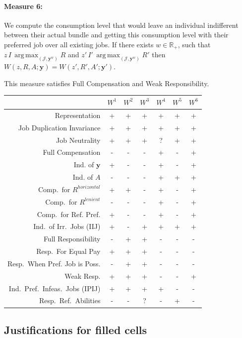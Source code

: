\documentclass[12pt,thmsb]{article}
\DeclareMathOperator*{\argmax}{arg\,max}
\begin{document}
\paragraph{Measure 6:} We compute the consumption level that would leave an individual indifferent between their actual bundle and getting this consumption level with their preferred job over all existing jobs. If there exists $w\in\mathbb{R}_{+}$, such that $z\,I\,\argmax_{(\mathcal{J},\mathbf{y}^w)}R$ and $z'\,I'\,\argmax_{(\mathcal{J},\mathbf{y}^w)}R'$ then $W(z,R,A;\mathbf{y})=W(z',R',A';\mathbf{y}')$.

This measure satisfies Full Compensation and Weak Responsibility.

\begin{center}
\begin{tabular}{r|c|c|c|c|c|c|}
 & $W^1$ & $W^2$ & $W^3$ & $W^4$ & $W^5$ & $W^6$ \\
\hline
Representation & + & + & + & + & + & + \\
Job Duplication Invariance & + & + & + & + & + & + \\
Job Neutrality & + & + & + & ? & + & + \\
Full Compensation & - & - & - & + & - & + \\
Ind. of $\mathbf{y}$ & + & - & - & + & - & + \\
Ind. of $A$ & - & - & - & + & + & + \\
Comp.\ for $R^{horizontal}$ & + & + & - & + & - & + \\
Comp.\ for $R^{lenient}$ & - & - & - & + & - & + \\
Comp.\ for Ref. Pref. & + & - & - & + & - & + \\
Ind.\ of Irr.\ Jobs (IIJ) & + & - & + & + & + & + \\
Full Responsibility & - & + & + & - & - & - \\
Resp.\ For Equal Pay & + & + & + & - & - & - \\
Resp.\ When Pref. Job is Poss. & - & + & + & - & - & - \\
Weak Resp. & + & + & + & - & - & + \\
Ind.\ Pref.\ Infeas.\ Jobs (IPIJ) & + & + & + & + & - & - \\
Resp.\ Ref.\ Abilities & - & - & ? & - & + & - \\
\end{tabular}
\end{center}

\subsection*{Justifications for filled cells}
\end{document}
